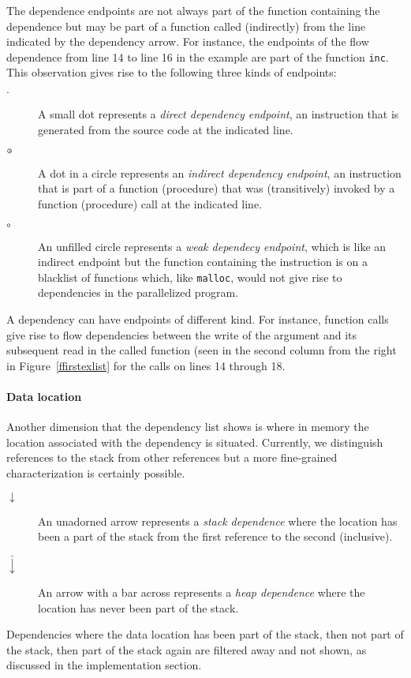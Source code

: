 The dependence endpoints are not always part of the function
containing the dependence but may be part of a function called
(indirectly) from the line indicated by the dependency arrow. For instance, the
endpoints of the flow dependence from line 14 to line 16 in the
example are part of the function {\tt inc}. This observation gives
rise to the following three kinds of endpoints:
\begin{description}
\item[$\cdot\ $] 
A small dot represents a {\em direct dependency endpoint}, an 
instruction that is
generated from the source code at the indicated line. 
\item[$\circ\hskip-0.35em\cdot\ $]
A dot in a circle represents an {\em indirect dependency endpoint},
an instruction that is part of a function (procedure) that was 
(transitively) invoked by a function (procedure) call at the indicated 
line.
\item[$\circ\ $]
An unfilled circle represents a {\em weak dependecy endpoint},
which is like an indirect endpoint but the function containing 
the instruction is on a blacklist of functions which, 
like {\tt malloc}, would not give rise to dependencies in the 
parallelized program.
\end{description}
A dependency can have endpoints of different kind. For instance,
function calls give rise to flow dependencies between the write of the
argument and its subsequent read in the called function (seen in the
second column from the right in Figure~\ref{ffirstexlist} for the
calls on lines 14 through 18.

\paragraph*{Data location}

Another dimension that the dependency list shows is where in memory
the location associated with the dependency is situated. Currently, we
distinguish references to the stack from other references but a more
fine-grained characterization is certainly possible.
\begin{description}
\item[$\downarrow\ $]
An unadorned arrow represents a
 {\em stack dependence} where the location has been a part of 
the stack from the first reference to the second (inclusive).
\item[$\bar{\downarrow}\ $]
An arrow with a bar across represents a
{\em heap dependence} where the location has never been part of the stack.
\end{description}
Dependencies where the data location has been part of the stack, then
not part of the stack, then part of the stack again are filtered away
and not shown, as discussed in the implementation section.

